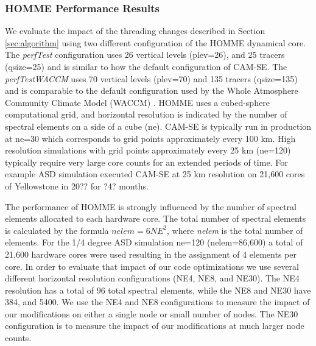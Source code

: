 \subsubsection{HOMME Performance Results}\label{sec:homme-results}

We evaluate the impact of the threading changes described in Section \ref{sec:algorithm} using two different configuration of the HOMME dynamical core.  The {\em perfTest} configuration uses 26 vertical levels (plev=26), and 25 tracers (qsize=25) and is similar to how the default configuration of CAM-SE.  The {\em perfTestWACCM} uses 70 vertical levels (plev=70) and 135 tracers (qsize=135) and is comparable to the default configuration used by the Whole Atmosphere Community Climate Model (WACCM) \cite{waccm}.  HOMME uses a cubed-sphere computational grid, and horizontal resolution is indicated by the number of spectral elements on a side of a cube (ne). CAM-SE is typically run in production at ne=30 which corresponds to grid points approximately every 100 km.  High resolution simulations with grid points approximately every 25 km (ne=120) typically require very large core counts for an extended periods of time.   For example ASD simulation \cite{small2014} executed CAM-SE at 25 km resolution on 21,600 cores of Yellowstone in 20?? for ?4? months.

The performance of HOMME is strongly influenced by the number of spectral elements allocated to each hardware core.  The total number of spectral elements is calculated by the formula $nelem= 6 NE^2$, where {\em nelem} is the total number of elements.   For the 1/4 degree ASD simulation \cite{small2014} ne=120 (nelem=86,600) a total of 21,600 hardware cores were used resulting in the assignment of 4 elements per core. In order to evaluate that impact of our code optimizations we use several different horizontal resolution configurations (NE4, NE8, and NE30). The NE4 resolution has a total of 96 total spectral elements, while the NE8 and NE30 have 384, and 5400.  We use the NE4 and NE8 configurations to measure the impact of our modifications on either a single node or small number of nodes.  The NE30 configuration is to measure the impact of our modifications at much larger node counts.  


